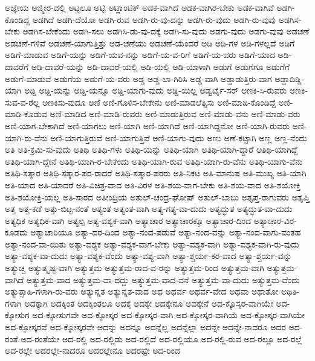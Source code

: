 {ಅಜ್ಞೇಯ
ಅಜ್ಮೀರ-ದಲ್ಲಿ
ಅಟ್ಟಲೂ
ಅಟ್ಟಿ
ಅಟ್ಲಾಂಟಿಕ್
ಅಡಕ-ವಾಗಿದೆ
ಅಡಕ-ವಾಗಿರ-ಬೇಕು
ಅಡಕ-ವಾಗಿವೆ
ಅಡಗಿ-ಕೊಂಡಿದ್ದ
ಅಡಗಿದೆ
ಅಡಗಿ-ದೆಯೋ
ಅಡಗಿ-ರುವ
ಅಡಗಿ-ರು-ವು-ದನ್ನು
ಅಡಗಿ-ರು-ವುದು
ಅಡಗಿ-ರು-ವುವು
ಅಡಗಿಸ-ಬೇಕು
ಅಡಗಿಸ-ಬೇಕೆಂದು
ಅಡಗಿ-ಸಲು
ಅಡಗಿಸಿ-ಡು-ವು-ದಕ್ಕೆ
ಅಡಗಿ-ಸು-ವುದು
ಅಡಗು-ವುದು
ಅಡಗು-ವುವು
ಅಡಚಣೆ
ಅಡಚಣೆ-ಗಳಿವೆ
ಅಡಚಣೆ-ಯಾಗುತ್ತಿತ್ತು
ಅಡ-ಚಣೆಯು
ಅಡಚಣೆ-ಯೆಂದರೆ
ಅಡಿ
ಅಡಿ-ಗಳ
ಅಡಿ-ಗಳಲ್ಲದೆ
ಅಡಿಗೆ
ಅಡಿಗೆ-ಮಾಡುವ
ಅಡಿಗೆ-ಯನ್ನು
ಅಡಿಗೆ-ಯವ-ನನ್ನು
ಅಡಿಗೆ-ಯ-ವ-ರಿಗೆ
ಅಡಿಗೆ-ಯ-ವರು
ಅಡಿಗೆ-ಯಾದ
ಅಡಿ-ದಾವರೆಗೆ
ಅಡಿ-ದಾವರೆ-ಯನ್ನು
ಅಡಿ-ದಾವರೆ-ಯಲ್ಲಿ
ಅಡಿ-ಯಲ್ಲಿ
ಅಡಿ-ಯಾಳಾಗಿ
ಅಡುಗೆ
ಅಡುಗೆಗೂ
ಅಡುಗೆಗೆ
ಅಡುಗೆ-ಮಾಡುವೆ
ಅಡುಗೆಯ
ಅಡುಗೆ-ಯ-ವರು
ಅಡ್ಡ
ಅಡ್ಡ-ಲಾ-ಗಿರಿಸಿ
ಅಡ್ಡ-ವಾಗಿ
ಅಡ್ಡಾಡುತ್ತಿರು-ವಾಗ
ಅಡ್ಡಾದಿಡ್ಡಿ-ಯಾಗಿ
ಅಡ್ಡಿ
ಅಡ್ಡಿ-ಯನ್ನು
ಅಡ್ಡಿ-ಯನ್ನೂ
ಅಡ್ಡಿ-ಯಾಗು-ವುದು
ಅಡ್ಡಿ-ಯಿಲ್ಲ
ಅಡ್ವರ್ಟೈ-ಸರ್
ಅಣಕಿ-ಸಿ-ರುವರು
ಅಣಕಿ-ಸುವ-ವ-ರೆಲ್ಲ
ಅಣಕಿಸು-ವುದೂ
ಅಣಿ
ಅಣಿ-ಗೊಳಿಸ-ಬೇಕೇನು
ಅಣಿ-ಮಾಡಲೆತ್ನಿಸು
ಅಣಿ-ಮಾಡಿ-ಕೊಂಡಿದ್ದೆ
ಅಣಿ-ಮಾಡಿ-ಕೊಡುವ
ಅಣಿ-ಮಾಡಿದ
ಅಣಿ-ಮಾಡಿ-ರುವರು
ಅಣಿ-ಮಾಡುತ್ತಿರುವ
ಅಣಿ-ಮಾಡು-ವನು
ಅಣಿ-ಮಾಡು-ವರು
ಅಣಿ-ಯಾಗ-ಬೇಕಾಗಿದೆ
ಅಣಿ-ಯಾಗಲು
ಅಣಿ-ಯಾಗಿ
ಅಣಿ-ಯಾಗಿದೆ
ಅಣಿ-ಯಾಗಿದ್ದನೋ
ಅಣಿ-ಯಾಗಿ-ರುವರು
ಅಣಿ-ಯಾಗಿ-ರು-ವೆನು
ಅಣಿ-ಯಾಗುತ್ತಿರುವೆ
ಅಣಿ-ಯಾಗುತ್ತಿವೆ
ಅಣಿ-ಯಾಗು-ವುದು
ಅಣು
ಅಣೆ-ಕಟ್ಟಾಗಿ
ಅಣ್ಣ
ಅಣ್ಣ-ನೆಂದು
ಅತಿ
ಅತಿ-ಕ್ರಮಿ-ಸು-ವುದು
ಅತಿಥಿ
ಅತಿಥಿ-ಗಳು
ಅತಿಥಿ-ಯನ್ನು
ಅತಿಥಿ-ಯಾಗಿ
ಅತಿಥಿ-ಯಾಗಿ-ದ್ದಾರೆ
ಅತಿಥಿ-ಯಾಗಿದ್ದೆ
ಅತಿಥಿ-ಯಾಗಿ-ದ್ದೇನೆ
ಅತಿಥಿ-ಯಾಗಿ-ರ-ಬೇಕೆಂದು
ಅತಿಥಿ-ಯಾಗಿ-ರುವ
ಅತಿಥಿ-ಯಾಗಿ-ರು-ವೆನು
ಅತಿಥಿ-ಯಾಗು-ವೆನು
ಅತಿಥಿ-ಸತ್ಕಾರ
ಅತಿಥಿ-ಸತ್ಕಾರ-ಪರ-ರಾದರೆ
ಅತಿಥಿ-ಸತ್ಕಾರ-ಪರರು
ಅತಿ-ನಿಕಟ
ಅತಿ-ಮಾನುಷ
ಅತಿ-ಮುಖ್ಯ
ಅತಿ-ಯಾಗಿ
ಅತಿ-ಯಾದ
ಅತಿ-ಯಾದರೆ
ಅತಿ-ವಿಚಿತ್ರ-ವಾದ
ಅತಿ-ವಿರಳ
ಅತಿ-ಶಯ-ವಾಗ-ಬೇಕು
ಅತಿ-ಶಯ-ವಾದ
ಅತಿ-ಶಯೋಕ್ತಿ
ಅತಿ-ಶಯೋಕ್ತಿ-ಯಲ್ಲ
ಅತಿ-ಸಾರದ
ಅತೀಂದ್ರಿಯ
ಅತುಲ್-ಚಂದ್ರ-ಘೋಷ್
ಅತುಲ್-ಬಾಬು
ಅತೃಪ್ತ-ರಾಗುವರು
ಅತೃಪ್ತಿ
ಅತ್ತ
ಅತ್ತ-ಕಡೆ
ಅತ್ತು-ಬಿಟ್ಟ-ನಂತೆ
ಅತ್ಯಂತ
ಅತ್ಯಂತ-ವಾಗಿ
ಅತ್ಯ-ಗತ್ಯ-ವಾ-ದುದು
ಅತ್ಯದ್ಭುತ
ಅತ್ಯದ್ಭುತ-ವಾ-ದುದು
ಅತ್ಯಧಿಕ
ಅತ್ಯಧಿಕ-ವಾಗಿ
ಅತ್ಯಲ್ಪ
ಅತ್ಯ-ವಶ್ಯಕ-ವಾಗಿ
ಅತ್ಯಾಚಾರ
ಅತ್ಯಾಚಾರಕ್ಕೂ
ಅತ್ಯಾಚಾರ-ದಿಂದ
ಅತ್ಯಾಚಾರ-ವಿರ-ಕೂಡದು
ಅತ್ಯಾಚಾರಿಯೂ
ಅತ್ಯಾ-ದರ-ದಿಂದ
ಅತ್ಯಾ-ನಂದ-ಪಡುವೆ
ಅತ್ಯಾ-ನಂದ-ವನ್ನು
ಅತ್ಯಾ-ನಂದ-ವಾಗು-ವಂತಹ
ಅತ್ಯಾ-ನಂದ-ವಾ-ಯಿತು
ಅತ್ಯಾ-ವಶ್ಯಕ
ಅತ್ಯಾ-ವಶ್ಯಕ-ವಾಗ-ಬೇಕು
ಅತ್ಯಾ-ವಶ್ಯಕ-ವಾಗಿ
ಅತ್ಯಾ-ವಶ್ಯಕ-ವಾಗಿ-ರು-ವುದು
ಅತ್ಯಾ-ವಶ್ಯಕ-ವಾ-ದುದು
ಅತ್ಯಾ-ವಶ್ಯಕ-ವೆಂದು
ಅತ್ಯಾ-ವಶ್ಯ-ವಾಗಿ
ಅತ್ಯಾ-ಶ್ಚರ್ಯ-ಕರ-ವಾದ
ಅತ್ಯಾ-ಶ್ಚರ್ಯ-ವನ್ನು
ಅತ್ಯುಚ್ಚ
ಅತ್ಯುತ್ಕೃಷ್ಟ-ವಾಗಿ
ಅತ್ಯುತ್ತಮ
ಅತ್ಯುತ್ತಮ-ರಾದ-ವ-ರನ್ನು
ಅತ್ಯುತ್ತಮ-ರಿಂದ
ಅತ್ಯುತ್ತಮ-ವಾಗಿ
ಅತ್ಯುತ್ತಮ-ವಾಗಿದೆ
ಅತ್ಯುತ್ತಮ-ವಾದ
ಅತ್ಯುತ್ತಮ-ವಾ-ದದ್ದು
ಅತ್ಯುತ್ತಮ-ವಾದ-ವನೆ
ಅತ್ಯುತ್ತಮ-ವಾ-ದುದು
ಅತ್ಯುತ್ತಮ-ವೆಂದು
ಅತ್ಯುತ್ಸಾಹಿ-ಗಳಾಗಿ-ರು-ವರು
ಅತ್ಯುನ್ನತ
ಅತ್ಯುನ್ನತ-ವಾದ
ಅಥ
ಅಥರ್ವ
ಅಥರ್ವ-ವೇದ
ಅಥವಾ
ಅಥಾತೋ
ಅಥಿತಿ-ಗಳಾಗಿ
ಅದಕ್ಕಾಗಿ
ಅದಕ್ಕಿಂತ
ಅದಕ್ಕಿಂತಲೂ
ಅದಕ್ಕೆ
ಅದಕ್ಕೇ
ಅದಕ್ಕೇನೂ
ಅದಕ್ಕೇನೆ
ಅದ-ಕ್ಕೊಸ್ಕರ-ವಾಗಿಯೇ
ಅದ-ಕ್ಕೋಸುಗ
ಅದ-ಕ್ಕೋಸುಗವೇ
ಅದ-ಕ್ಕೋಸ್ಕರ
ಅದ-ಕ್ಕೋಸ್ಕರ-ವಾಗಿ
ಅದ-ಕ್ಕೋಸ್ಕರ-ವಾಗಿಯೆ
ಅದ-ಕ್ಕೋಸ್ಕರ-ವಾಗಿಯೇ
ಅದ-ಕ್ಕೋಸ್ಕರವೆ
ಅದ-ಕ್ಕೋಸ್ಕರವೇ
ಅದನ್ನು
ಅದನ್ನೂ
ಅದನ್ನೆಲ್ಲ
ಅದನ್ನೆಲ್ಲಾ
ಅದನ್ನೇ
ಅದನ್ನೇ-ನಾದರೂ
ಅದರ
ಅದ-ರಂತೆ
ಅದ-ರಂತೆಯೇ
ಅದ-ರಲ್ಲಿ
ಅದ-ರಲ್ಲಿಡು
ಅದ-ರಲ್ಲಿದೆ
ಅದ-ರಲ್ಲಿಯೂ
ಅದ-ರಲ್ಲಿ-ರುವ
ಅದ-ರಲ್ಲೂ
ಅದ-ರಲ್ಲೆ
ಅದ-ರಲ್ಲೇ
ಅದರಲ್ಲೇ-ನಾದರೂ
ಅದರಲ್ಲೇನೂ
ಅದರಷ್ಟೇ
ಅದ-ರಿಂದ
}
